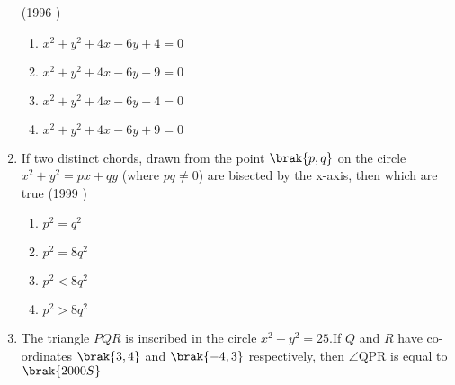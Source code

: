 \begin{enumerate}
    \hfill {(1996 )}
    \begin{enumerate}
    	\item $x^{2}+y^{2}+4x-6y+4=0$
    	\item $x^{2}+y^{2}+4x-6y-9=0$
    	\item $x^{2}+y^{2}+4x-6y-4=0$
    	\item $x^{2}+y^{2}+4x-6y+9=0$
    \end{enumerate}
    \item If two distinct chords,  drawn from the point $\brak{p, q}$ on the circle $x^{2}+y^{2}=px+qy$ (where $pq \neq 0$) are bisected by the x-axis,  then which are true
    \hfill {(1999 )}
    \begin{enumerate}
    	\item $p^{2}=q^{2}$
    	\item $p^{2}=8q^{2}$ 
    	\item $p^{2}<8q^{2}$
    	\item $p^{2}>8q^{2}$
    \end{enumerate}
        \item The triangle $PQR$ is inscribed in the circle $x^2+y^2=25$.If $Q$ and $R$ have co-ordinates $\brak{3, 4}$ and $\brak{-4, 3}$ respectively, then $\angle$QPR is equal to  
    \hfill$\brak{2000S}$
    
    
    \begin{multicols}{2}
    \begin{enumerate}
    

\end{enumerate}
\end{multicols}
\end{enumerate}
